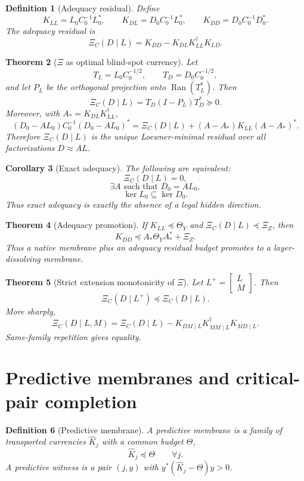 \documentclass[11pt]{article}
\newtheorem{theorem}{Theorem}[section]
\newtheorem{corollary}[theorem]{Corollary}
\newtheorem{definition}[theorem]{Definition}
\DeclareMathOperator{\range}{Ran}
\newcommand{\Loewner}{\preceq}
\begin{document}
\begin{definition}[Adequacy residual]
Define
\[
  K_{LL}=L_0C_0^{-1}L_0^*,\qquad
  K_{DL}=D_0C_0^{-1}L_0^*,\qquad
  K_{DD}=D_0C_0^{-1}D_0^*.
\]
The adequacy residual is
\[
  \boxed{\Xi_C(D\mid L)=K_{DD}-K_{DL}K_{LL}^\dagger K_{LD}.}
\]
\end{definition}

\begin{theorem}[\(\Xi\) as optimal blind-spot currency]
Let
\[
  T_L=L_0C_0^{-1/2},\qquad T_D=D_0C_0^{-1/2},
\]
and let \(P_L\) be the orthogonal projection onto \(\range(T_L^*)\).  Then
\[
  \Xi_C(D\mid L)=T_D(I-P_L)T_D^*\succeq0.
\]
Moreover, with \(A_*=K_{DL}K_{LL}^\dagger\),
\[
  (D_0-AL_0)C_0^{-1}(D_0-AL_0)^*
  =\Xi_C(D\mid L)+(A-A_*)K_{LL}(A-A_*)^*.
\]
Therefore \(\Xi_C(D\mid L)\) is the unique Loewner-minimal residual over all factorizations \(D\approx AL\).
\end{theorem}

\begin{corollary}[Exact adequacy]
The following are equivalent:
\[
  \Xi_C(D\mid L)=0,
\]
\[
  \exists A\text{ such that }D_0=AL_0,
\]
\[
  \ker L_0\subseteq\ker D_0.
\]
Thus exact adequacy is exactly the absence of a legal hidden direction.
\end{corollary}

\begin{theorem}[Adequacy promotion]
If \(K_{LL}\Loewner\Theta_Y\) and \(\Xi_C(D\mid L)\Loewner\Xi_Z\), then
\[
  K_{DD}\Loewner A_*\Theta_YA_*^*+\Xi_Z.
\]
Thus a native membrane plus an adequacy residual budget promotes to a layer-dissolving membrane.
\end{theorem}

\begin{theorem}[Strict extension monotonicity of \(\Xi\)]
Let \(L^+=\begin{bmatrix}L\\M\end{bmatrix}\).  Then
\[
  \Xi_C(D\mid L^+)\Loewner\Xi_C(D\mid L).
\]
More sharply,
\[
  \Xi_C(D\mid L,M)=\Xi_C(D\mid L)-K_{DM\mid L}K_{MM\mid L}^\dagger K_{MD\mid L}.
\]
Same-family repetition gives equality.
\end{theorem}

\section{Predictive membranes and critical-pair completion}

\begin{definition}[Predictive membrane]
A predictive membrane is a family of transported currencies \(\widehat K_j\) with a common budget \(\Theta\),
\[
  \widehat K_j\Loewner\Theta\qquad\forall j.
\]
A predictive witness is a pair \((j,y)\) with \(y^*(\widehat K_j-\Theta)y>0\).
\end{definition}
\end{document}
